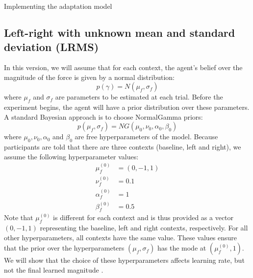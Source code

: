 \documentclass{report}
\begin{document}
\begin{chapter}{Implementing the adaptation model}
\subsection{Left-right with unknown mean and standard deviation (LRMS)}
In this version, we will assume that for each context, the agent's belief over
the magnitude of the force is given by a normal distribution:
\begin{equation}
p(\gamma) = N(\mu_f, \sigma_f) \label{eqn:data-dist}
\end{equation}
where $\mu_f$ and $\sigma_f$ are parameters to be estimated at each
trial. Before the experiment begins, the agent will have a prior distribution
over these parameters. A standard Bayesian approach is to choose NormalGamma
priors:
\begin{equation}
p(\mu_f, \sigma_f) = NG(\mu_0, \nu_0, \alpha_0, \beta_0)
\end{equation}
where $\mu_0, \nu_0, \alpha_0$ and $\beta_0$ are free hyperparameters of the
model. Because participants are told that there are three contexts (baseline,
left and right), we assume the following hyperparameter values:
\begin{align} \mu_f^{(0)} &= (0, -1, 1) \\
  \nu_f^{(0)} &= 0.1 \\
  \alpha_f^{(0)} &= 1 \\
  \beta_f^{(0)} &= 0.5
\end{align}
Note that $\mu_f^{(0)}$ is different for each context and is thus
provided as a vector $(0, -1, 1)$ representing the baseline, left and right
contexts, respectively. For all other hyperparameters, all contexts have the
same value. These values ensure that the prior over the hyperparameters
$(\mu_f, \sigma_f)$ has the mode at $(\mu_f^{(0)}, 1)$. We will show that the
choice of these hyperparameters affects learning rate, but not the final
learned magnitude .


\end{chapter}
\end{document}
